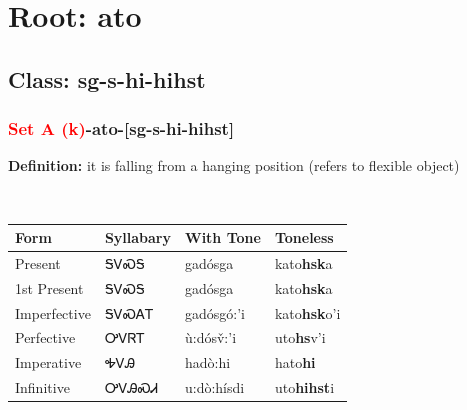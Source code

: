 \needspace{4in}
\section*{Root: ato}
\nopagebreak
{}
\needspace{3in}
\subsection*{Class: sg-s-hi-hihst}
\nopagebreak
\needspace{2in}
\subsubsection*{\textcolor{Red}{Set A (k)}{-}\textbf{ato}{-}[sg-s-hi-hihst]}
\nopagebreak
\textbf{Definition: } it is falling from a hanging position (refers to flexible object)
\\[0.5em]
\begin{tabularx}{\textwidth}{l X X X}%
\toprule%
\textbf{Form}&\textbf{Syllabary}&\textbf{With Tone}&\textbf{Toneless}\\%
\midrule%
Present&ᎦᏙᏍᎦ&gadósga&kato\textbf{hsk}a\\%
1st Present&ᎦᏙᏍᎦ&gadósga&kato\textbf{hsk}a\\%
Imperfective&ᎦᏙᏍᎪᎢ&gadósgó:’i&kato\textbf{hsk}o'i\\%
Perfective&ᎤᏙᏒᎢ&ù:dósv̌:’i&uto\textbf{hs}v'i\\%
Imperative&ᎭᏙᎯ&hadò:hi&hato\textbf{hi}\\%
Infinitive&ᎤᏙᎯᏍᏗ&u:dò:hísdi&uto\textbf{hihst}i\\%
\bottomrule%
\end{tabularx}
\\[1em]